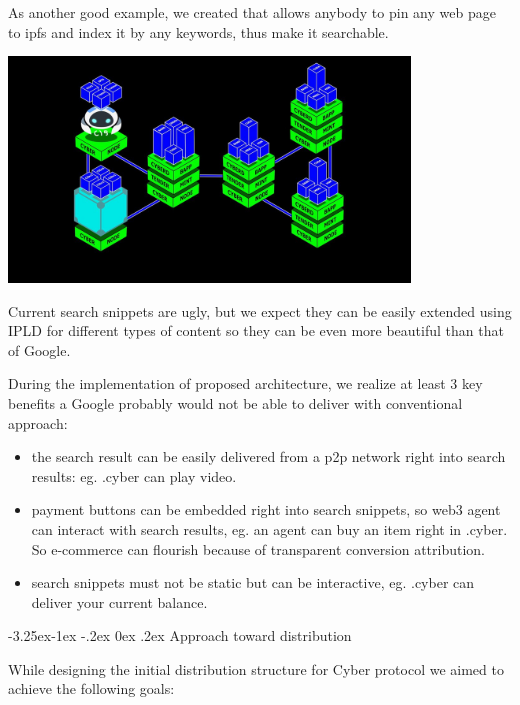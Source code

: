 \documentclass[8pt,oneside]{amsart}
\makeatletter
\newcommand{\linkred}[2]{\href{#1}{\color{red}{#2}}}
\renewcommand\subsection{\@startsection{subsection}{2}{\z@}%
                                     {-3.25ex\@plus -1ex \@minus -.2ex}%
                                     {0ex \@plus .2ex}%
                                     {\play\Large}}%
\newcommand{\titleSection}[1]{\subsection{#1}}
\newcommand{\code}[1]{{\PlayBold #1}}
\newenvironment{Figure}
  {\par\medskip\noindent\minipage{\linewidth}}
  {\endminipage\par\medskip}
\makeatother
\begin{document}
As another good example, we created \linkred{https://github.com/cybercongress/cyb-virus}{a Chrome extension} that allows anybody to pin any web page to ipfs and index it by any keywords, thus make it searchable.

\begin{Figure}
  \centering
  \includegraphics[width=0.8\textwidth]{architecture.jpg}
\end{Figure}

Current search snippets are ugly, but we expect they can be easily extended using IPLD for different types of content so they can be even more beautiful than that of Google.

During the implementation of proposed architecture, we realize at least 3 key benefits a Google probably would not be able to deliver with conventional approach:

\begin{itemize}
\item the search result can be easily delivered from a p2p network right into search results: eg. .cyber can play video.
\item payment buttons can be embedded right into search snippets, so web3 agent can interact with search results, eg. an agent can buy an item right in \code{.cyber}. So e-commerce can flourish because of transparent conversion attribution.
\item search snippets must not be static but can be interactive, eg. \code{.cyber} can deliver your current balance.
\end{itemize}

\titleSection{Approach toward distribution}\label{Approach toward distribution}

While designing the initial distribution structure for Cyber protocol we aimed to achieve the following goals:
\end{document}
